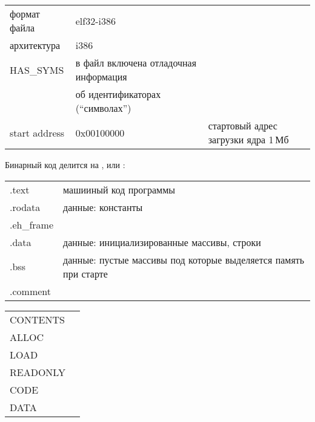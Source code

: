 \label{elf}

\begin{tabular}{l l l}
формат файла & elf32-i386 \\
архитектура & i386 \\
HAS\_SYMS & в файл включена отладочная информация \\& об идентификаторах
(``символах'')\\
start address & 0x00100000 & стартовый адрес загрузки ядра 1\,Мб\\
\end{tabular}

\bigskip
Бинарный код делится на , или
:

\begin{tabular}{l l}
.text & машииный код программы \\
.rodata & данные: константы \\
.eh\_frame &\\
.data & данные: инициализированные массивы, строки \\
.bss & данные: пустые массивы под которые выделяется память при старте \\
.comment &\\
\end{tabular}

\bigskip
\begin{tabular}{l l}
CONTENTS & \\
ALLOC & \\
LOAD & \\
READONLY & \\
CODE & \\
DATA & \\
\end{tabular}

